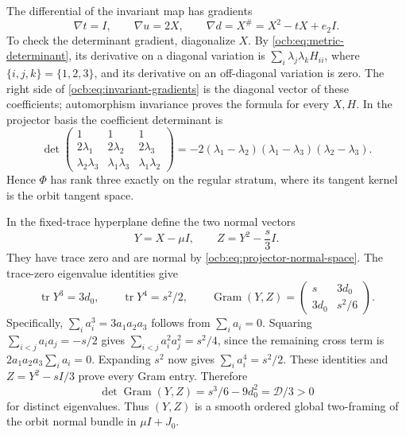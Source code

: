\documentclass[11pt]{article}
\theoremstyle{definition}
\begin{document}
The differential of the invariant map has gradients
\begin{equation}
 \nabla t=I,\qquad\nabla u=2X,\qquad
 \nabla d=X^\#=X^2-tX+e_2I.
 \label{ocb:eq:invariant-gradients}\tag{OCB21}
\end{equation}
To check the determinant gradient, diagonalize $X$. By
\eqref{ocb:eq:metric-determinant}, its derivative on a diagonal
variation is $\sum_i\lambda_j\lambda_k H_{ii}$, where
$\{i,j,k\}=\{1,2,3\}$, and its derivative on an off-diagonal
variation is zero. The right side of
\eqref{ocb:eq:invariant-gradients} is the diagonal vector of these
coefficients; automorphism invariance proves the formula for every
$X,H$. In the projector basis the coefficient determinant is
\begin{equation}
 \det\begin{pmatrix}
 1&1&1\\2\lambda_1&2\lambda_2&2\lambda_3\\
 \lambda_2\lambda_3&\lambda_1\lambda_3&\lambda_1\lambda_2
 \end{pmatrix}
 =-2(\lambda_1-\lambda_2)(\lambda_1-\lambda_3)
                                      (\lambda_2-\lambda_3).
 \label{ocb:eq:gradient-determinant}\tag{OCB22}
\end{equation}
Hence $\Phi$ has rank three exactly on the regular stratum, where
its tangent kernel is the orbit tangent space.

In the fixed-trace hyperplane define the two normal vectors
\begin{equation}
 Y=X-\mu I,\qquad Z=Y^2-\frac{s}{3}I.
 \label{ocb:eq:two-normal-fields}\tag{OCB23}
\end{equation}
They have trace zero and are normal by
\eqref{ocb:eq:projector-normal-space}. The trace-zero eigenvalue
identities give
\begin{equation}
 \operatorname{tr}Y^3=3d_0,\qquad
 \operatorname{tr}Y^4=s^2/2,\qquad
 \operatorname{Gram}(Y,Z)=
 \begin{pmatrix}s&3d_0\\3d_0&s^2/6\end{pmatrix}.
 \label{ocb:eq:normal-gram}\tag{OCB24}
\end{equation}
Specifically, $\sum_i a_i^3=3a_1a_2a_3$ follows from
$\sum_i a_i=0$. Squaring $\sum_{i<j}a_ia_j=-s/2$ gives
$\sum_{i<j}a_i^2a_j^2=s^2/4$, since the remaining cross term is
$2a_1a_2a_3\sum_i a_i=0$. Expanding $s^2$ now gives
$\sum_i a_i^4=s^2/2$. These identities and
$Z=Y^2-sI/3$ prove every Gram entry. Therefore
\begin{equation}
 \det\operatorname{Gram}(Y,Z)=s^3/6-9d_0^2
                             =\mathcal D/3>0
 \label{ocb:eq:normal-gram-determinant}\tag{OCB25}
\end{equation}
for distinct eigenvalues. Thus $(Y,Z)$ is a smooth ordered global
two-framing of the orbit normal bundle in $\mu I+J_0$.
\end{document}

